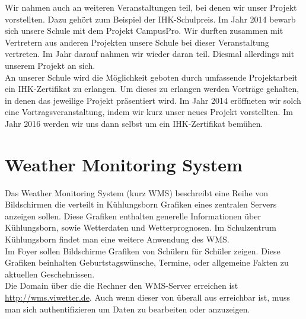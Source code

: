 \documentclass[a4paper,oneside,12pt,titlepage]{article}
\newcommand{\link}[1]{\textcolor{link}{\url{#1}}}	%
\begin{document}
Wir nahmen auch an weiteren Veranstaltungen teil, bei denen wir unser Projekt vorstellten. Dazu gehört zum Beispiel der IHK-Schulpreis. Im Jahr 2014 bewarb sich unsere Schule mit dem Projekt CampusPro. Wir durften zusammen mit Vertretern aus anderen Projekten unsere Schule bei dieser Veranstaltung vertreten. Im Jahr darauf nahmen wir wieder daran teil. Diesmal allerdings mit unserem Projekt an sich.\\
An unserer Schule wird die Möglichkeit geboten durch umfassende Projektarbeit ein IHK-Zertifikat zu erlangen. Um dieses zu erlangen werden Vorträge gehalten, in denen das jeweilige Projekt präsentiert wird. Im Jahr 2014 eröffneten wir solch eine Vortragsveranstaltung, indem wir kurz unser neues Projekt vorstellten. Im Jahr 2016 werden wir uns dann selbst um ein IHK-Zertifikat bemühen.

\section{Weather Monitoring System}
Das Weather Monitoring System (kurz WMS) beschreibt eine Reihe von Bildschirmen die verteilt in Kühlungsborn Grafiken eines zentralen Servers anzeigen sollen. Diese Grafiken enthalten generelle Informationen über Kühlungsborn, sowie Wetterdaten und Wetterprognosen. Im Schulzentrum Kühlungsborn findet man eine weitere Anwendung des WMS. \\
Im Foyer sollen Bildschirme Grafiken von Schülern für Schüler zeigen. Diese Grafiken beinhalten Geburtstagswünsche, Termine, oder allgemeine Fakten zu aktuellen Geschehnissen. \\
Die Domain über die die Rechner den WMS-Server erreichen ist \link{http://wms.viwetter.de}. Auch wenn dieser von überall aus erreichbar ist, muss man sich authentifizieren um Daten zu bearbeiten oder anzuzeigen.
\end{document}
